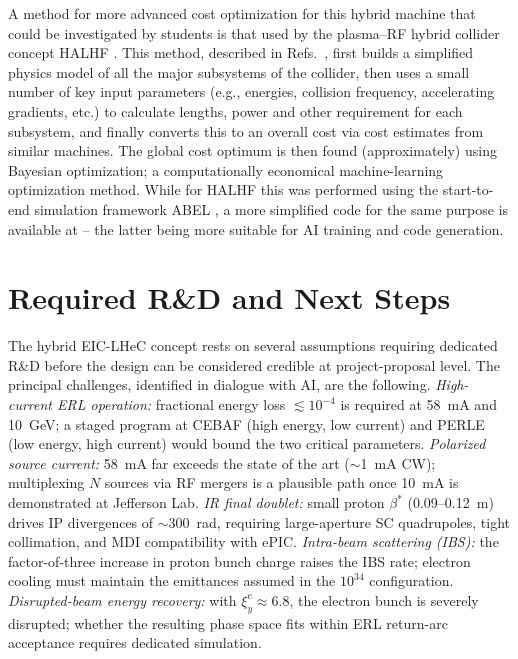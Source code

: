 \documentclass[%
               refpage,       %
               biblatex,     %
               hyphens,      %
               ]{jacow}
\begin{document}
A method for more advanced cost optimization for this hybrid machine that could be investigated by students is that used by the plasma--RF hybrid collider concept HALHF \cite{HALHF2023}. This method, described in Refs.~\cite{HALHF_ESSPU,HALHF_IPAC}, first builds a simplified physics model of all the major subsystems of the collider, then uses a small number of key input parameters (e.g., energies, collision frequency, accelerating gradients, etc.) to calculate lengths, power and other requirement for each subsystem, and finally converts this to an overall cost via cost estimates from similar machines. The global cost optimum is then found (approximately) using Bayesian optimization; a computationally economical machine-learning optimization method. While for HALHF this was performed using the start-to-end simulation framework ABEL \cite{ABEL,ABEL_GITHUB}, a more simplified code for the same purpose is available at \cite{COSTMODEL} -- the latter being more suitable for AI training and code generation.

 
\section{Required R\&D and Next Steps}

The hybrid EIC-LHeC concept rests on several assumptions requiring 
dedicated R\&D before the design can be considered credible at 
project-proposal level. The principal challenges, identified in dialogue 
with AI, are the following. \textit{High-current ERL operation:} 
fractional energy loss $\lesssim 10^{-4}$ is required at 58~mA and 
10~GeV; a staged program at CEBAF (high energy, low current) and PERLE 
(low energy, high current) would bound the two critical parameters. 
\textit{Polarized source current:} 58~mA far exceeds the state of the 
art ($\sim$1~mA CW); multiplexing $N$ sources via RF mergers is a 
plausible path once 10~mA is demonstrated at Jefferson Lab. 
\textit{IR final doublet:} small proton $\beta^*$ (0.09--0.12~m) drives 
IP divergences of $\sim$300~\textmu rad, requiring large-aperture SC 
quadrupoles, tight collimation, and MDI compatibility with ePIC. 
\textit{Intra-beam scattering (IBS):} the factor-of-three increase in proton 
bunch charge raises the IBS rate; electron cooling must maintain the 
emittances assumed in the $10^{34}$ configuration. 
\textit{Disrupted-beam energy recovery:} with $\xi_y^e \approx 6.8$, 
the electron bunch is severely disrupted; whether the resulting 
phase space fits within ERL return-arc acceptance requires dedicated 
simulation.
\end{document}

